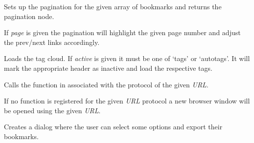 \documentclass[letterpaper,10pt,openany]{sphinxmanual}
\begin{document}

\begin{fulllineitems}
\label{Applications/terminal/plugin_bookmarks:GateOne.Bookmarks.loadPagination}
Sets up the pagination for the given array of bookmarks and returns the pagination node.

If \emph{page} is given the pagination will highlight the given page number and adjust the prev/next links accordingly.

\end{fulllineitems}


\begin{fulllineitems}
\label{Applications/terminal/plugin_bookmarks:GateOne.Bookmarks.loadTagCloud}
Loads the tag cloud.  If \emph{active} is given it must be one of `tags' or `autotags'.  It will mark the appropriate header as inactive and load the respective tags.

\end{fulllineitems}


\begin{fulllineitems}
\label{Applications/terminal/plugin_bookmarks:GateOne.Bookmarks.openBookmark}
Calls the function in  associated with the protocol of the given \emph{URL}.

If no function is registered for the given \emph{URL} protocol a new browser window will be opened using the given \emph{URL}.

\end{fulllineitems}


\begin{fulllineitems}
\label{Applications/terminal/plugin_bookmarks:GateOne.Bookmarks.openExportDialog}
Creates a dialog where the user can select some options and export their bookmarks.

\end{fulllineitems}
\end{document}
